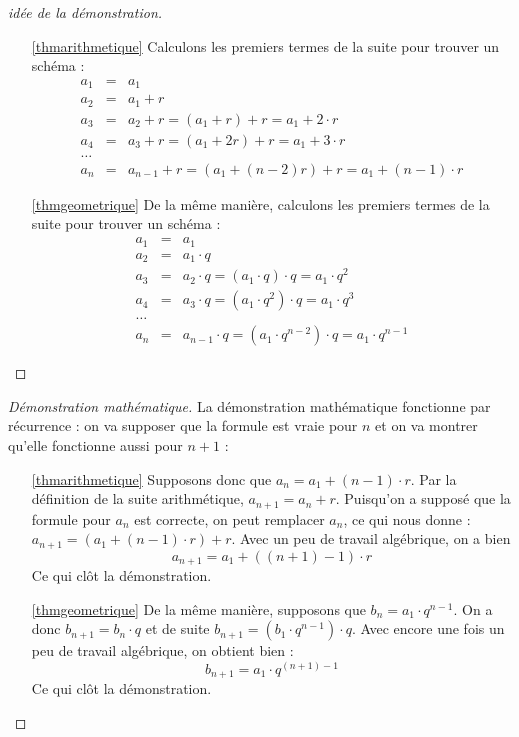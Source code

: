 \begin{proof}[idée de la démonstration]
\begin{enumerate}
\item[\ref{thmarithmetique}] Calculons les premiers termes de la suite pour trouver un schéma :
$$
\begin{array}{lll}
a_1 &=& a_1\\
a_2 &=& a_1 + r\\
a_3 &=& a_2 + r = (a_1+r)+r = a_1 + 2\cdot r\\
a_4 &=& a_3 + r = (a_1 + 2r) + r = a_1 + 3\cdot r\\
\dots \\
a_n &=& a_{n-1} + r = (a_1 + (n-2) r) + r = a_1 + (n-1)\cdot r
\end{array}
$$
\item[\ref{thmgeometrique}] De la même manière, calculons les premiers termes de la suite pour trouver un schéma :
$$
\begin{array}{lll}
a_1 &=& a_1\\
a_2 &=& a_1 \cdot q\\
a_3 &=& a_2 \cdot q = (a_1\cdot q)\cdot q = a_1 \cdot q^2\\
a_4 &=& a_3 \cdot q = (a_1 \cdot q^2) \cdot q = a_1 \cdot q^3\\
\dots \\
a_n &=& a_{n-1} \cdot q = (a_1 \cdot q^{n-2})\cdot q= a_1\cdot q^{n-1}
\end{array}
$$
\end{enumerate}
\end{proof}

\begin{proof}[Démonstration mathématique]
La démonstration mathématique fonctionne par récurrence : on va supposer que la formule est vraie pour $n$ et on va montrer qu'elle fonctionne aussi pour $n+1$ :
\begin{enumerate}
\item[\ref{thmarithmetique}] Supposons donc que $a_n = a_1 + (n-1)\cdot r$. Par la définition de la suite arithmétique, $a_{n+1} = a_n +r$. Puisqu'on a supposé que la formule pour $a_n$ est correcte, on peut remplacer $a_n$, ce qui nous donne : $a_{n+1} = (a_1 + (n-1)\cdot r )+ r$. Avec un peu de travail algébrique, on a bien 
$$
a_{n+1} = a_1 + ((n+1)-1) \cdot r
$$
Ce qui clôt la démonstration.
\item[\ref{thmgeometrique}] De la même manière, supposons que $b_n = a_1 \cdot q^{n-1}$. On a donc $b_{n+1} = b_n \cdot q$ et de suite $b_{n+1} = (b_1 \cdot q^{n-1}) \cdot q$. Avec encore une fois un peu de travail algébrique, on obtient bien :
$$
b_{n+1} = a_1 \cdot q^{(n+1)-1}
$$
Ce qui clôt la démonstration.
\end{enumerate}
\end{proof}

